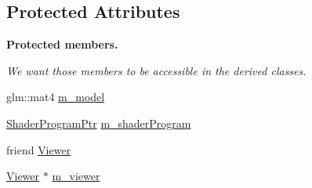 \subsection*{Protected Attributes}
\begin{Indent}{\bf Protected members.}\par
{\em We want those members to be accessible in the derived classes. }\begin{DoxyCompactItemize}
\item 
glm\+::mat4 \hyperlink{classRenderable_ab3a7f6112bd9d8c37ab10dac24186b25}{m\+\_\+model}
\item 
\hyperlink{ShaderProgram_8hpp_af8e4af1ad4c53875ee5d32ab7e1f4966}{Shader\+Program\+Ptr} \hyperlink{classRenderable_ad4004cea2d9ca6cc91eb03b4ce885088}{m\+\_\+shader\+Program}
\item 
friend \hyperlink{classRenderable_aaf644a3bff63df86024c9ad960d00e74}{Viewer}
\item 
\hyperlink{classViewer}{Viewer} $\ast$ \hyperlink{classRenderable_a691422fa44ec05fae13d94902870d6c0}{m\+\_\+viewer}
\end{DoxyCompactItemize}
\end{Indent}
